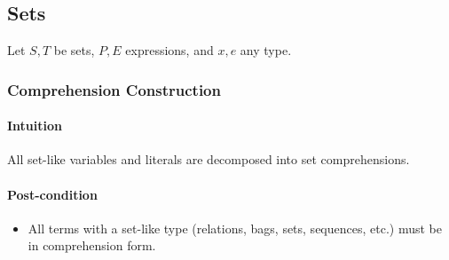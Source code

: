 \documentclass{article}
\begin{document}
\subsection{Sets}

Let $S,T$ be sets, $P, E$ expressions, and $x, e$ any type.
\subsubsection{Comprehension Construction}

\paragraph{Intuition} All set-like variables and literals are decomposed into set comprehensions.

\paragraph{Post-condition}
\begin{itemize}
  \item All terms with a set-like type (relations, bags, sets, sequences, etc.) must be in comprehension form.
\end{itemize}
\end{document}
